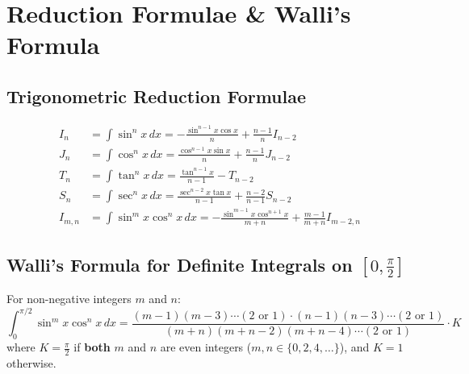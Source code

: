 \section{Reduction Formulae \& Walli's Formula}

\subsection{Trigonometric Reduction Formulae}

\begin{keyequation}
\begin{align}
    I_n &= \int \sin^n x\,dx = -\frac{\sin^{n-1}x \cos x}{n} + \frac{n-1}{n} I_{n-2} \\
    J_n &= \int \cos^n x\,dx = \frac{\cos^{n-1}x \sin x}{n} + \frac{n-1}{n} J_{n-2} \\
    T_n &= \int \tan^n x\,dx = \frac{\tan^{n-1}x}{n-1} - T_{n-2} \\
    S_n &= \int \sec^n x\,dx = \frac{\sec^{n-2}x \tan x}{n-1} + \frac{n-2}{n-1} S_{n-2} \\
    I_{m,n} &= \int \sin^m x \cos^n x\,dx = -\frac{\sin^{m-1}x \cos^{n+1}x}{m+n} + \frac{m-1}{m+n} I_{m-2,n}
\end{align}
\end{keyequation}

\subsection{Walli's Formula for Definite Integrals on $\left[0, \frac{\pi}{2}\right]$}

\begin{theorem}
For non-negative integers $m$ and $n$:
\begin{equation}
    \int_0^{\pi/2} \sin^m x \cos^n x\,dx = \frac{(m-1)(m-3)\cdots(2 \text{ or } 1) \cdot (n-1)(n-3)\cdots(2 \text{ or } 1)}{(m+n)(m+n-2)(m+n-4)\cdots(2 \text{ or } 1)} \cdot K
\end{equation}
where $K = \frac{\pi}{2}$ if \textbf{both} $m$ and $n$ are even integers ($m, n \in \{0, 2, 4, \dots\}$), and $K = 1$ otherwise.
\end{theorem}

